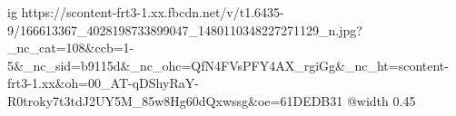  
 
 
 
 

\ifcmt
  ig https://scontent-frt3-1.xx.fbcdn.net/v/t1.6435-9/166613367_4028198733899047_1480110348227271129_n.jpg?_nc_cat=108&ccb=1-5&_nc_sid=b9115d&_nc_ohc=QfN4FVsPFY4AX_rgiGg&_nc_ht=scontent-frt3-1.xx&oh=00_AT-qDShyRaY-R0troky7t3tdJ2UY5M_85w8Hg60dQxwssg&oe=61DEDB31
  @width 0.45
\fi
